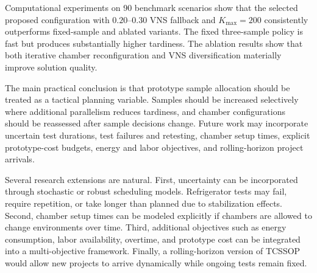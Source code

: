 \documentclass[11pt]{article}
\begin{document}
Computational experiments on 90 benchmark scenarios show that the selected proposed configuration with \(0.20\)--\(0.30\) VNS fallback and \(K_{\max}=200\) consistently outperforms fixed-sample and ablated variants. The fixed three-sample policy is fast but produces substantially higher tardiness. The ablation results show that both iterative chamber reconfiguration and VNS diversification materially improve solution quality.

The main practical conclusion is that prototype sample allocation should be treated as a tactical planning variable. Samples should be increased selectively where additional parallelism reduces tardiness, and chamber configurations should be reassessed after sample decisions change. Future work may incorporate uncertain test durations, test failures and retesting, chamber setup times, explicit prototype-cost budgets, energy and labor objectives, and rolling-horizon project arrivals.

Several research extensions are natural. First, uncertainty can be incorporated through stochastic or robust scheduling models. Refrigerator tests may fail, require repetition, or take longer than planned due to stabilization effects. Second, chamber setup times can be modeled explicitly if chambers are allowed to change environments over time. Third, additional objectives such as energy consumption, labor availability, overtime, and prototype cost can be integrated into a multi-objective framework. Finally, a rolling-horizon version of TCSSOP would allow new projects to arrive dynamically while ongoing tests remain fixed.



\end{document}
